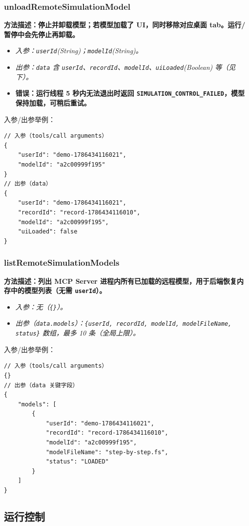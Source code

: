 \subsubsection{unloadRemoteSimulationModel}
\bf{方法描述}：停止并卸载模型；若模型加载了 UI，同时移除对应桌面 tab。运行/暂停中会先停止再卸载。
\begin{itemize}
	\item \it{入参}：\texttt{userId}(String)；\texttt{modelId}(String)。
	\item \it{出参}：\texttt{data} 含 \texttt{userId}、\texttt{recordId}、\texttt{modelId}、\texttt{uiLoaded}(Boolean) 等（见下）。
	\item \bf{错误}：运行线程 5 秒内无法退出时返回 \texttt{SIMULATION\_CONTROL\_FAILED}，模型保持加载，可稍后重试。
\end{itemize}
入参/出参举例：
\begin{lstlisting}
// 入参（tools/call arguments）
{
    "userId": "demo-1786434116021",
    "modelId": "a2c00999f195"
}
// 出参（data）
{
    "userId": "demo-1786434116021",
    "recordId": "record-1786434116010",
    "modelId": "a2c00999f195",
    "uiLoaded": false
}
\end{lstlisting}\vspace{-30pt}

\subsubsection{listRemoteSimulationModels}
\bf{方法描述}：列出 MCP Server 进程内所有已加载的远程模型，用于后端恢复内存中的模型列表（无需 \texttt{userId}）。
\begin{itemize}
	\item \it{入参}：无（\texttt{\{\}}）。
	\item \it{出参}（\texttt{data.models}）：\texttt{\{userId, recordId, modelId, modelFileName, status\}} 数组，最多 10 条（全局上限）。
\end{itemize}
入参/出参举例：
\begin{lstlisting}
// 入参（tools/call arguments）
{}
// 出参（data 关键字段）
{
    "models": [
        {
            "userId": "demo-1786434116021",
            "recordId": "record-1786434116010",
            "modelId": "a2c00999f195",
            "modelFileName": "step-by-step.fs",
            "status": "LOADED"
        }
    ]
}
\end{lstlisting}\vspace{-30pt}

\subsection{运行控制}
